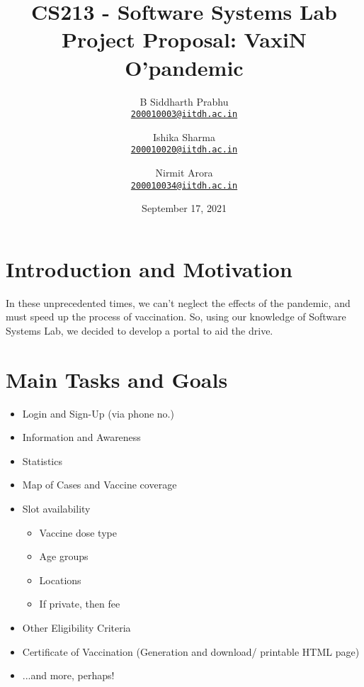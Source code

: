 \documentclass{article}
\title{\textbf{
CS213 - Software Systems Lab \\ 
Project Proposal: VaxiN O'pandemic
}}
\author{
  B Siddharth Prabhu\\
  \href{mailto:200010003@iitdh.ac.in}{\texttt{200010003@iitdh.ac.in}}
  \and
  Ishika Sharma\\
  \href{mailto:200010020@iitdh.ac.in}{\texttt{200010020@iitdh.ac.in}}
  \and
  Nirmit Arora\\
  \href{mailto:200010034@iitdh.ac.in}{\texttt{200010034@iitdh.ac.in}}
}
\date{September 17, 2021}
\begin{document}
\maketitle

\section{Introduction and Motivation}
In these unprecedented times, we can't neglect the effects of the pandemic, and must speed up the process of vaccination. So, using our knowledge of Software Systems Lab, we decided to develop a portal to aid the drive.

\section{Main Tasks and Goals}
\begin{itemize}
    \item Login and Sign-Up (via phone no.) %
    \item Information and Awareness
    \item Statistics %
    \item Map of Cases and Vaccine coverage %
    \item Slot availability
    \begin{itemize}
        \item Vaccine dose type
        \item Age groups
        \item Locations
        \item If private, then fee
    \end{itemize}
    \item Other Eligibility Criteria
    \item Certificate of Vaccination (Generation and download/ printable HTML page)
    \item ...and more, perhaps!
\end{itemize}
\end{document}
